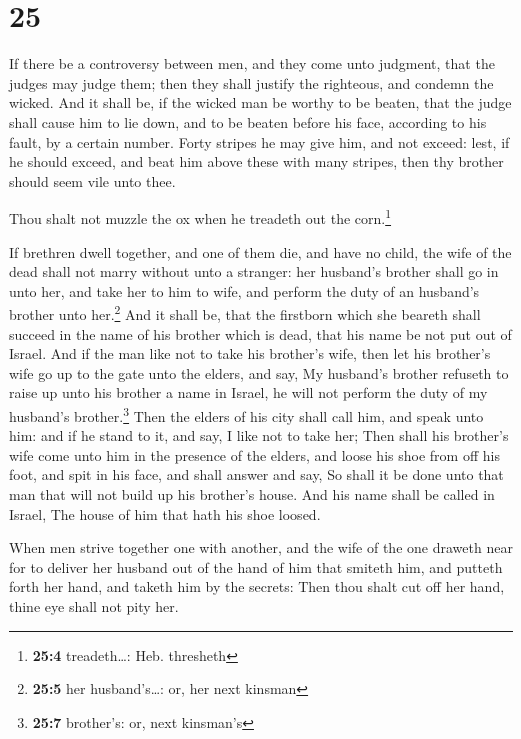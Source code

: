 \hypertarget{section-24}{%
\section{25}\label{section-24}}

 If there be a controversy between men, and they come unto
judgment, that the judges may judge them; then they shall justify the
righteous, and condemn the wicked.  And it shall be, if
the wicked man be worthy to be beaten, that the judge shall cause him to
lie down, and to be beaten before his face, according to his fault, by a
certain number.  Forty stripes he may give him, and not
exceed: lest, if he should exceed, and beat him above these with many
stripes, then thy brother should seem vile unto thee.

 Thou shalt not muzzle the ox when he treadeth out the
corn.\footnote{\textbf{25:4} treadeth\ldots: Heb. thresheth}

 If brethren dwell together, and one of them die, and have
no child, the wife of the dead shall not marry without unto a stranger:
her husband's brother shall go in unto her, and take her to him to wife,
and perform the duty of an husband's brother unto her.\footnote{\textbf{25:5}
  her husband's\ldots: or, her next kinsman}  And it shall
be, that the firstborn which she beareth shall succeed in the name of
his brother which is dead, that his name be not put out of Israel.
 And if the man like not to take his brother's wife, then
let his brother's wife go up to the gate unto the elders, and say, My
husband's brother refuseth to raise up unto his brother a name in
Israel, he will not perform the duty of my husband's brother.\footnote{\textbf{25:7}
  brother's: or, next kinsman's}  Then the elders of his
city shall call him, and speak unto him: and if he stand to it, and say,
I like not to take her;  Then shall his brother's wife
come unto him in the presence of the elders, and loose his shoe from off
his foot, and spit in his face, and shall answer and say, So shall it be
done unto that man that will not build up his brother's house.
 And his name shall be called in Israel, The house of him
that hath his shoe loosed.

 When men strive together one with another, and the wife
of the one draweth near for to deliver her husband out of the hand of
him that smiteth him, and putteth forth her hand, and taketh him by the
secrets:  Then thou shalt cut off her hand, thine eye
shall not pity her.

